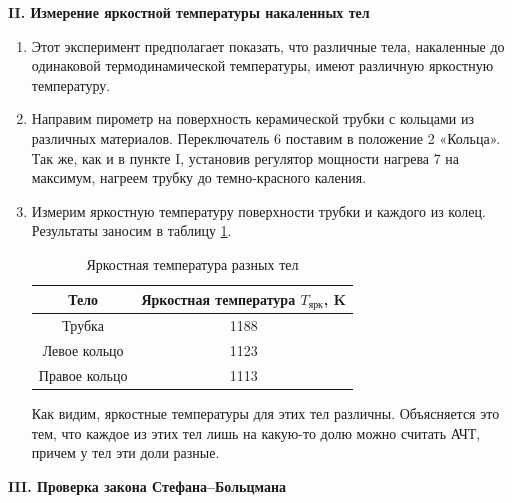 	\begin{center}
		\textbf{II. Измерение яркостной температуры накаленных тел}
	\end{center}

	\begin{enumerate}
		\item Этот эксперимент предполагает показать, что различные тела, накаленные до одинаковой термодинамической температуры, имеют различную яркостную температуру.
		
		\item Направим пирометр на поверхность керамической трубки с кольцами из различных материалов. Переключатель 6 поставим в положение 2 «Кольца». Так же, как и в пункте I, установив регулятор мощности нагрева 7 на максимум, нагреем трубку до темно-красного каления.
		
		\item Измерим яркостную температуру поверхности трубки и каждого из колец. Результаты заносим в таблицу \ref{Stefan_Boltz_Tube_Rings}.
		
		
		\begin{table}[h!]
			\centering

			\begin{tabular}{|c|c|}
				\hline
				Тело          & Яркостная температура $T_\text{ярк}$, K \\ \hline
				Трубка        & 1188                                    \\ \hline
				Левое кольцо  & 1123                                    \\ \hline
				Правое кольцо & 1113                                    \\ \hline
			\end{tabular}
			\caption{Яркостная температура разных тел}
			\label{Stefan_Boltz_Tube_Rings}
		\end{table}
	
		Как видим, яркостные температуры для этих тел различны. Объясняется это тем, что каждое из этих тел лишь на какую-то долю можно считать АЧТ, причем у тел эти доли разные.
	\end{enumerate}

	\begin{center}
		\textbf{III. Проверка закона Стефана–Больцмана}
	\end{center}

